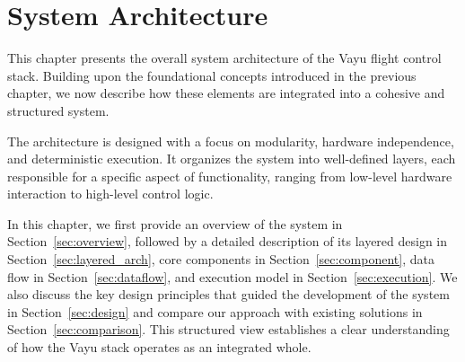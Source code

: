\chapter{System Architecture}
\label{chap:architecture}
This chapter presents the overall system architecture of the Vayu flight control stack. Building upon the foundational concepts introduced in the previous chapter, we now describe how these elements are integrated into a cohesive and structured system.

The architecture is designed with a focus on modularity, hardware independence, and deterministic execution. It organizes the system into well-defined layers, each responsible for a specific aspect of functionality, ranging from low-level hardware interaction to high-level control logic.

In this chapter, we first provide an overview of the system in Section~\ref{sec:overview}, followed by a detailed description of its layered design in Section~\ref{sec:layered_arch}, core components in Section~\ref{sec:component}, data flow in Section~\ref{sec:dataflow}, and execution model in Section~\ref{sec:execution}. We also discuss the key design principles that guided the development of the system in Section~\ref{sec:design} and compare our approach with existing solutions in Section~\ref{sec:comparison}. This structured view establishes a clear understanding of how the Vayu stack operates as an integrated whole.









